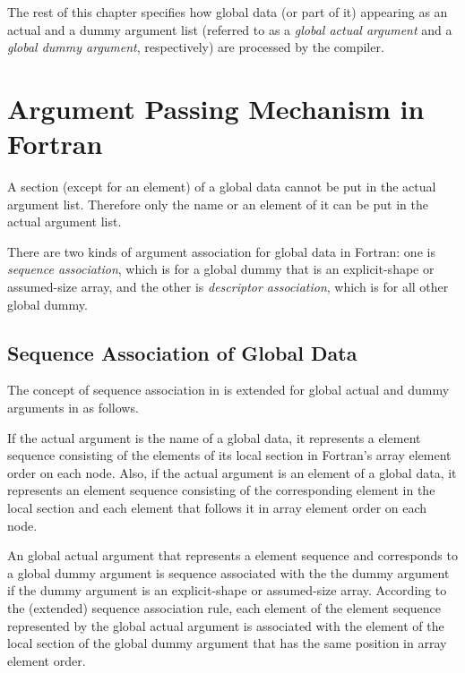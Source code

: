 \vspace{1.5zw}

\hspace{-1.2\parindent}
The rest of this chapter specifies how global data (or part of it)
appearing as an actual and a dummy argument list (referred to as a {\it
global actual argument} and a {\it global dummy argument}, respectively)
are processed by the {\XMP} compiler.


\section{Argument Passing Mechanism in {\XMP} Fortran}

A section (except for an element) of a global data cannot be put in the
actual argument list. Therefore only the name or an element of it can be
put in the actual argument list.

There are two kinds of argument association for global data in {\XMP}
Fortran: one is {\it sequence association}, which is for a global dummy
that is an explicit-shape or assumed-size array, and the other is
{\it descriptor association}, which is for all other global dummy.


\subsection{Sequence Association of Global Data}

The concept of sequence association in {\Fort} is extended for global
actual and dummy arguments in {\XMP} as follows.

If the actual argument is the name of a global data, it represents a
element sequence consisting of the elements of its local section in
Fortran's array element order on each node.
%
Also, if the actual argument is an element of a global data, it
represents an element sequence consisting of the corresponding element
in the local section and each element that follows it in array element
order on each node.

An global actual argument that represents a element sequence and
corresponds to a global dummy argument is sequence associated with
the the dummy argument if the dummy argument is an explicit-shape or
assumed-size array.
%
According to the (extended) sequence association rule, each element of
the element sequence represented by the global actual argument is
associated with the element of the local section of the global dummy
argument that has the same position in array element order.


